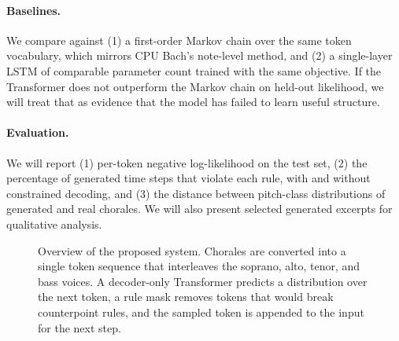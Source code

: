 \documentclass{article}
\begin{document}
\paragraph{Baselines.} We compare against (1) a first-order Markov chain over the same token vocabulary, which mirrors CPU Bach's note-level method, and (2) a single-layer LSTM of comparable parameter count trained with the same objective. If the Transformer does not outperform the Markov chain on held-out likelihood, we will treat that as evidence that the model has failed to learn useful structure.

\paragraph{Evaluation.} We will report (1) per-token negative log-likelihood on the test set, (2) the percentage of generated time steps that violate each rule, with and without constrained decoding, and (3) the distance between pitch-class distributions of generated and real chorales. We will also present selected generated excerpts for qualitative analysis.

\begin{figure}[t]
  \centering
  \caption{Overview of the proposed system. Chorales are converted into a single token sequence that interleaves the soprano, alto, tenor, and bass voices. A decoder-only Transformer predicts a distribution over the next token, a rule mask removes tokens that would break counterpoint rules, and the sampled token is appended to the input for the next step.}
  \label{fig:arch}
\end{figure}
\end{document}
